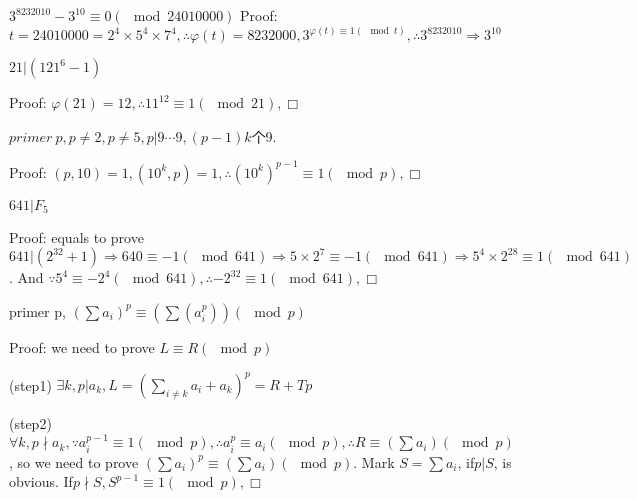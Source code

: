\documentclass[UTF8]{../09-Mathematics}
\begin{document}
\begin{proposition}
    $3^{8232010}-3^{10} \equiv 0 (\mod 24010000)$
    Proof:$t =24010000 = 2^4\times 5^4\times7^4, \therefore \varphi(t)=8232000,3^{\varphi(t) \equiv 1(\mod t)}, \therefore 3^{8232010} \Rightarrow 3^{10} $
\end{proposition}

\begin{proposition}
    $21 | (121^6-1)$

    Proof: $\varphi(21) = 12, \therefore 11^{12} \equiv 1 (\mod 21), \Box $
\end{proposition}

\begin{proposition}
    $primer \ p, p \neq 2, p \neq 5, p|9\cdots 9, (p-1)k$个9.
    
    Proof: $(p,10) = 1, (10^k, p) = 1, \therefore (10^k)^{p-1} \equiv 1 (\mod p), \Box $
\end{proposition}

\begin{proposition}
    $641 | F_5$
    
    Proof: equals to prove $641 |(2^{32}+1) 
    \Rightarrow 640 \equiv -1(\mod 641)
    \Rightarrow 5 \times 2^7 \equiv -1(\mod 641)
    \Rightarrow 5^4 \times 2^{28} \equiv 1(\mod 641)
    $. And $ \because 5^4 \equiv -2^4(\mod 641), \therefore -2^{32} \equiv 1(\mod 641), \Box$
\end{proposition}

\begin{proposition}
    primer p, $(\sum a_i)^p \equiv (\sum(a_i^p) )(\mod p)$
    
    Proof: we need to prove $L \equiv R(\mod p)$
    
    (step1) $\exists k, p|a_k, L = (\sum_{i \neq k}a_i + a_k)^p = R+Tp$

    (step2)$\forall k, p \nmid a_k, \because a_i^{p-1} \equiv 1 ( \mod p), \therefore a_i^{p} \equiv a_i ( \mod p), \therefore R \equiv (\sum a_i)(\mod p)$, so we need to prove $(\sum a_i)^p \equiv (\sum a_i)(\mod p)$. Mark $S = \sum a_i$, if$p|S$, is obvious. If$p\nmid S, S^{p-1} \equiv 1 (\mod p), \Box$
\end{proposition}
\end{document}
